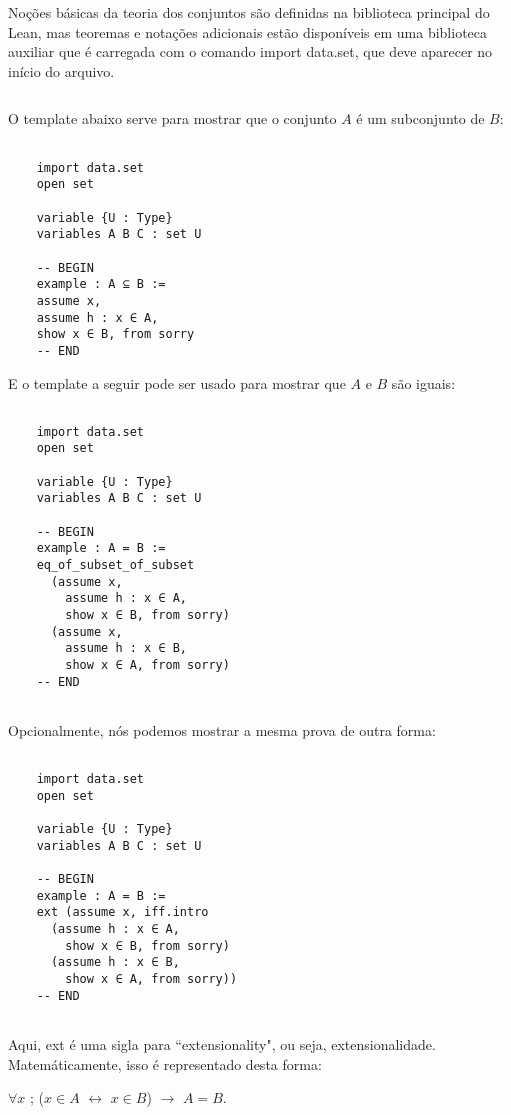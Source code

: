 Noções básicas da teoria dos conjuntos são definidas na biblioteca principal do Lean, mas teoremas e notações adicionais estão disponíveis em uma biblioteca auxiliar que é carregada com o comando 
{
\selectfont import data.set}, que deve aparecer no início do arquivo.

$\qquad$

O template abaixo serve para mostrar que o conjunto $A$ é um subconjunto de $B$:
\begin{lstlisting}

    import data.set
    open set

    variable {U : Type}
    variables A B C : set U

    -- BEGIN
    example : A ⊆ B :=
    assume x,
    assume h : x ∈ A,
    show x ∈ B, from sorry
    -- END

\end{lstlisting}

E o template a seguir pode ser usado para mostrar que $A$ e $B$ são iguais:
\begin{lstlisting}

    import data.set
    open set

    variable {U : Type}
    variables A B C : set U

    -- BEGIN
    example : A = B :=
    eq_of_subset_of_subset
      (assume x,
        assume h : x ∈ A,
        show x ∈ B, from sorry)
      (assume x,
        assume h : x ∈ B,
        show x ∈ A, from sorry)
    -- END
    
\end{lstlisting}

Opcionalmente, nós podemos mostrar a mesma prova de outra forma:
\begin{lstlisting}

    import data.set
    open set

    variable {U : Type}
    variables A B C : set U

    -- BEGIN
    example : A = B :=
    ext (assume x, iff.intro
      (assume h : x ∈ A,
        show x ∈ B, from sorry)
      (assume h : x ∈ B,
        show x ∈ A, from sorry))
    -- END
    
\end{lstlisting}

Aqui, {
\selectfont ext} é uma sigla para ``extensionality", ou seja, extensionalidade. Matemáticamente, isso é representado desta forma:

\begin{center}
    $\forall x$ ; ($x \in A$ $\leftrightarrow$ $x \in B$) $\rightarrow$ $A = B$.  
\end{center}

